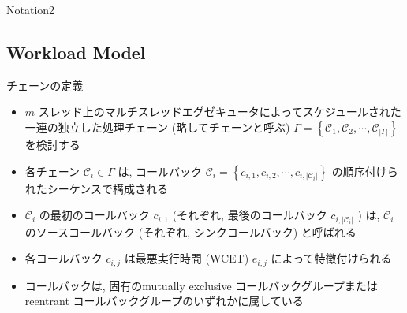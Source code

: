\begin{frame}{Notation2}
    \begin{table}[tb]
    \end{table}

    \todo{}
\end{frame}

\subsection{Workload Model}
\label{ssec: workload_model}

\begin{frame}{チェーンの定義}

    \begin{itemize}
        \item $m$ スレッド上のマルチスレッドエグゼキュータによってスケジュールされた一連の独立した処理チェーン (略してチェーンと呼ぶ) $\Gamma=\left\{\mathcal{C}_{1}, \mathcal{C}_{2}, \cdots, \mathcal{C}_{|\Gamma|}\right\}$ を検討する


        \item 各チェーン $\mathcal{C}_{i} \in \Gamma$ は, コールバック $\mathcal{C}_{i}=\left\{c_{i, 1}, c_{i, 2}, \cdots, c_{i,\left|\mathcal{C}_{i}\right|}\right\}$ の順序付けられたシーケンスで構成される
        \item $\mathcal{C}_{i}$ の最初のコールバック $c_{i, 1}$ (それぞれ, 最後のコールバック $c_{i,\left|\mathcal{C}_{i}\right|}$ ) は, $\mathcal{C}_{i}$ のソースコールバック (それぞれ, シンクコールバック) と呼ばれる
    \end{itemize}
\end{frame}

\begin{frame}{}
    \begin{itemize}
        \item 各コールバック $c_{i, j}$ は最悪実行時間 (WCET) $e_{i, j}$ によって特徴付けられる
        \item コールバックは, 固有のmutually exclusive コールバックグループまたはreentrant コールバックグループのいずれかに属している
    \end{itemize}
\end{frame}

